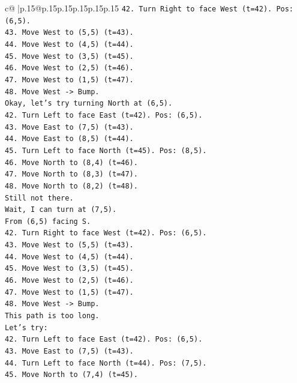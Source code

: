 \documentclass{article}
\begin{document}
{\begin{supertabular}{c@{$\;$}|p{.15\linewidth}@{}p{.15\linewidth}p{.15\linewidth}p{.15\linewidth}p{.15\linewidth}p{.15\linewidth}}
{{{\texttt{42. Turn Right to face West (t=42). Pos: (6,5).} \\
\texttt{43. Move West to (5,5) (t=43).} \\
\texttt{44. Move West to (4,5) (t=44).} \\
\texttt{45. Move West to (3,5) (t=45).} \\
\texttt{46. Move West to (2,5) (t=46).} \\
\texttt{47. Move West to (1,5) (t=47).} \\
\texttt{48. Move West {-}> Bump.} \\
\texttt{Okay, let's try turning North at (6,5).} \\
\texttt{42. Turn Left to face East (t=42). Pos: (6,5).} \\
\texttt{43. Move East to (7,5) (t=43).} \\
\texttt{44. Move East to (8,5) (t=44).} \\
\texttt{45. Turn Left to face North (t=45). Pos: (8,5).} \\
\texttt{46. Move North to (8,4) (t=46).} \\
\texttt{47. Move North to (8,3) (t=47).} \\
\texttt{48. Move North to (8,2) (t=48).} \\
\texttt{Still not there.} \\
\texttt{Wait, I can turn at (7,5).} \\
\texttt{From (6,5) facing S.} \\
\texttt{42. Turn Right to face West (t=42). Pos: (6,5).} \\
\texttt{43. Move West to (5,5) (t=43).} \\
\texttt{44. Move West to (4,5) (t=44).} \\
\texttt{45. Move West to (3,5) (t=45).} \\
\texttt{46. Move West to (2,5) (t=46).} \\
\texttt{47. Move West to (1,5) (t=47).} \\
\texttt{48. Move West {-}> Bump.} \\
\texttt{This path is too long.} \\
\texttt{Let's try:} \\
\texttt{42. Turn Left to face East (t=42). Pos: (6,5).} \\
\texttt{43. Move East to (7,5) (t=43).} \\
\texttt{44. Turn Left to face North (t=44). Pos: (7,5).} \\
\texttt{45. Move North to (7,4) (t=45).} \\
}}}
\end{supertabular}}
\end{document}
